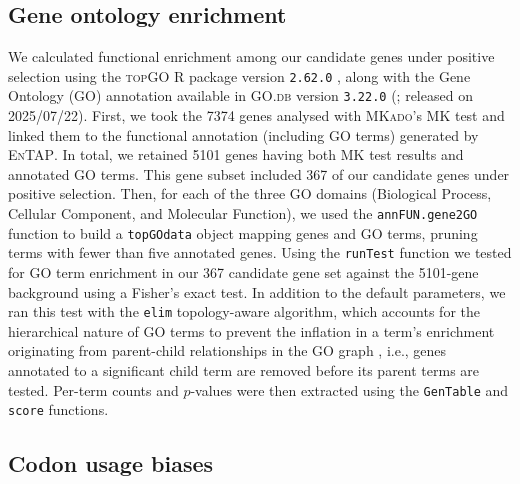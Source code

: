 \subsection*{Gene ontology enrichment}

We calculated functional enrichment among our candidate genes under positive selection
using the \textsc{topGO} R package version \texttt{2.62.0} \citep{alexa_topgo_2017},
along with the Gene Ontology (GO) annotation available in \textsc{GO.db} version
\texttt{3.22.0} (\citealp{carlson_godb_2017}; released on 2025/07/22).
First, we took the \num{7374} genes analysed with \textsc{MKado}'s MK test and linked
them to the functional annotation (including GO terms) generated by \textsc{EnTAP}.
In total, we retained \num{5101} genes having both MK test results and annotated GO terms.
This gene subset included 367 of our candidate genes under positive selection.
Then, for each of the three GO domains (Biological Process, Cellular Component, and
Molecular Function), we used the \texttt{annFUN.gene2GO} function to build a
\texttt{topGOdata} object mapping genes and GO terms, pruning terms with fewer than five
annotated genes.
Using the \texttt{runTest} function we tested for GO term enrichment in our 367 candidate
gene set against the \num{5101}-gene background using a Fisher's exact test.
In addition to the default parameters, we ran this test with the \texttt{elim} topology-aware
algorithm, which accounts for the hierarchical nature of GO terms to prevent the inflation
in a term's enrichment originating from parent-child relationships in the GO graph
\citep{alexa_topgo_2006}, i.e., genes annotated to a significant child term are removed
before its parent terms are tested.
Per-term counts and $p$-values were then extracted using the \texttt{GenTable} and
\texttt{score} functions.

\subsection*{Codon usage biases}

